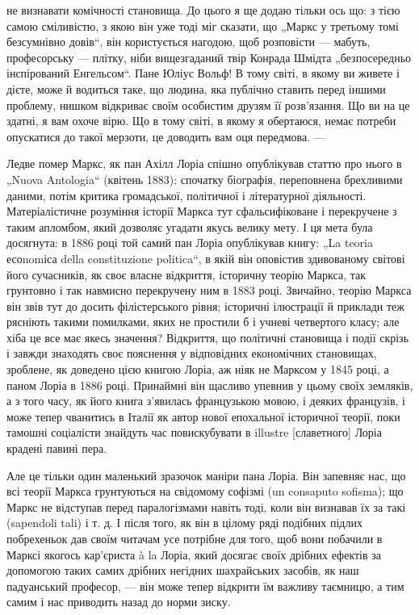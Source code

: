 \parcont{}  %
не визнавати комічності становища. До цього я ще додаю тільки
ось що: з тією самою сміливістю, з якою він уже тоді міг сказати,
що „Маркс у третьому томі безсумнівно довів“, він користується
нагодою, щоб розповісти — мабуть, професорську —
плітку, ніби вищезгаданий твір Конрада Шмідта „безпосередньо
інспірований Енгельсом“. Пане Юліус Вольф! В тому світі, в якому
ви живете і дієте, може й водиться таке, що людина, яка публічно
ставить перед іншими проблему, нишком відкриває своїм
особистим друзям її розв’язання. Що ви на це здатні, я вам охоче
вірю. Що в тому світі, в якому я обертаюся, немає потреби
опускатися до такої мерзоти, це доводить вам оця передмова. —

Ледве помер Маркс, як пан Ахілл Лоріа спішно опублікував
статтю про нього в „Nuova Antologia“ (квітень 1883): спочатку
біографія, переповнена брехливими даними, потім критика
громадської, політичної і літературної діяльності. Матеріалістичне
розуміння історії Маркса тут сфальсифіковане і перекручене
з таким апломбом, який дозволяє угадати якусь велику
мету. І ця мета була досягнута: в 1886 році той самий пан
Лоріа опублікував книгу: „La teoria есоnomіса della constituzione
politica“, в якій він оповістив здивованому світові його сучасників,
як своє власне відкриття, історичну теорію Маркса, так
грунтовно і так навмисно перекручену ним в 1883 році. Звичайно,
теорію Маркса він звів тут до досить філістерського
рівня; історичні ілюстрації й приклади теж рясніють такими помилками,
яких не простили б і учневі четвертого класу; але
хіба це все має якесь значення? Відкриття, що політичні становища
і події скрізь і завжди знаходять своє пояснення у відповідних
економічних становищах, зроблене, як доведено цією книгою
Лоріа, аж ніяк не Марксом у 1845 році, а паном Лоріа
в 1886 році. Принаймні він щасливо упевнив у цьому своїх земляків,
а з того часу, як його книга з’явилась французькою мовою,
і деяких французів, і може тепер чванитись в Італії як
автор нової епохальної історичної теорії, поки тамошні соціалісти
знайдуть час повискубувати в illustre [славетного] Лоріа
крадені павині пера.

Але це тільки один маленький зразочок маніри пана Лоріа.
Він запевняє нас, що всі теорії Маркса грунтуються на свідомому
софізмі (un consaputo sofisma); що Маркс не відступав
перед паралогізмами навіть тоді, коли він визнавав їх за такі
(sapendoli tali) і т. д. І після того, як він в цілому ряді подібних
підлих побрехеньок дав своїм читачам усе потрібне для
того, щоб вони побачили в Марксі якогось кар’єриста à la Лоріа,
який досягає своїх дрібних ефектів за допомогою таких самих
дрібних негідних шахрайських засобів, як наш падуанський професор,
— він може тепер відкрити їм важливу таємницю, а тим
самим і нас приводить назад до норми зиску.

